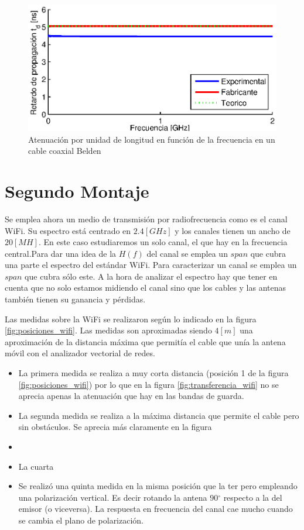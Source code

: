 \documentclass[10pt,conference,a4paper]{IEEEtran}
\newcommand{\degree}{\ensuremath{^\circ}}
\begin{document}
\begin{figure}[htb]
    \centering
    \includegraphics[width=\columnwidth]{figuras/retardo.eps}
    \caption{Atenuación por unidad de longitud en función de la frecuencia en un cable coaxial Belden}
    \label{fig:retardo_coaxial}
\end{figure}

\section{Segundo Montaje}

Se emplea ahora un medio de transmisión por radiofrecuencia como es el canal WiFi. Su espectro está centrado en $2.4[GHz]$ y los canales tienen un ancho de $20[MH]$. En este caso estudiaremos un solo canal, el que hay en la frecuencia central.Para dar una idea de la $H(f)$ del canal se emplea un $span$ que cubra una parte  el espectro del estándar WiFi. Para caracterizar un canal se emplea un $span$ que cubra sólo este. A la hora de analizar el espectro hay que tener en cuenta que no solo estamos midiendo el canal sino que los cables y las antenas también tienen su ganancia y pérdidas.

 
Las medidas sobre la WiFi se realizaron según lo indicado en la figura \ref{fig:posiciones_wifi}. Las medidas son aproximadas siendo $4[m]$ una aproximación de la distancia máxima que permitía el cable que unía la antena móvil con el analizador vectorial de redes.
\begin{itemize}
    \item La primera medida se realiza a muy corta distancia (posición 1 de la figura \ref{fig:posiciones_wifi}) por lo que en la figura \ref{fig:transferencia_wifi} no se aprecia apenas la atenuación que hay en las bandas de guarda.
    \item La segunda medida se realiza a la máxima distancia que permite el cable pero sin obstáculos. Se aprecia más claramente en la figura 
    \item 
    \item La cuarta 
    \item Se realizó una quinta medida en la misma posición que la ter pero empleando una polarización vertical. Es decir rotando la antena $90\degree$ respecto a la del emisor (o viceversa). La respuesta en frecuencia del canal cae mucho cuando se cambia el plano de polarización.
\end{itemize}
\end{document}
